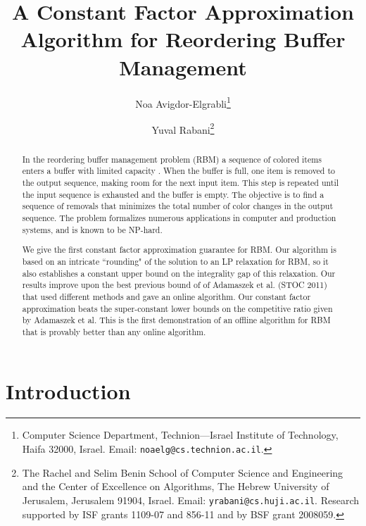 \documentclass[11pt]{article}
\begin{document}
\title{A Constant Factor Approximation Algorithm for
Reordering Buffer Management}

\author{Noa Avigdor-Elgrabli\thanks{Computer Science Department,
Technion---Israel Institute of Technology, Haifa 32000, Israel.
Email: {\tt noaelg@cs.technion.ac.il}.}
\and
Yuval Rabani\thanks{The Rachel and Selim Benin School of
Computer Science and Engineering and the Center of Excellence
on Algorithms, The Hebrew University of Jerusalem, Jerusalem
91904, Israel. Email: {\tt yrabani@cs.huji.ac.il}.
Research supported by ISF grants 1109-07 and 856-11 and
by BSF grant 2008059.}
}

\date{}

\setcounter{footnote}{3}
\maketitle

\begin{abstract}
In the reordering buffer management problem (RBM) a sequence
of  colored items enters a buffer with limited capacity .
When the buffer is full, one item is removed to the output sequence,
making room for the next input item. This step is repeated until
the input sequence is exhausted and the buffer is empty. The
objective is to find a sequence of removals that minimizes the
total number of color changes in the output sequence. The
problem formalizes numerous applications in computer and
production systems, and is known to be NP-hard.

We give the first constant factor approximation guarantee for RBM.
Our algorithm is based on an intricate ``rounding" of the solution
to an LP relaxation for RBM, so it also establishes a constant upper
bound on the integrality gap of this relaxation. Our results improve
upon the best previous bound of  of Adamaszek
et al. (STOC 2011) that used different methods and gave an online
algorithm. Our constant factor approximation beats the super-constant
lower bounds on the competitive ratio given by Adamaszek et al. This
is the first demonstration of an offline algorithm for RBM that is provably
better than any online algorithm.
\end{abstract}

\thispagestyle{empty}
\newpage
\setcounter{page}{1}

\section{Introduction}
\end{document}

